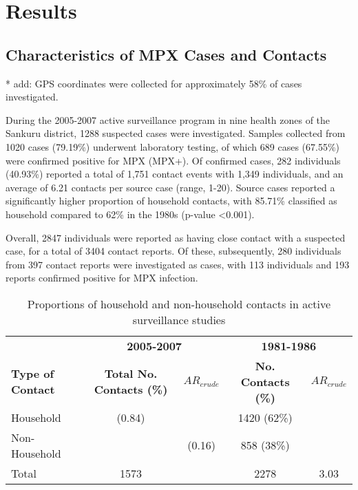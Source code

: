 \section{Results}

\subsection{Characteristics of MPX Cases and Contacts}

* add: GPS coordinates were collected for approximately 58\% of cases investigated. 

During the 2005-2007 active surveillance program in nine health zones of the Sankuru district, 1288 suspected cases were investigated. Samples collected from 1020 cases (79.19\%) underwent laboratory testing, of which 689 cases (67.55\%) were confirmed positive for MPX (MPX+). Of confirmed cases, 282 individuals (40.93\%) reported a total of 1,751 contact events with 1,349 individuals, and an average of 6.21 contacts per source case (range, 1-20). Source cases reported a significantly higher proportion of household contacts, with 85.71\% classified as household compared to 62\% in the 1980s (p-value \textless 0.001).

Overall, 2847 individuals were reported as having close contact with a suspected case, for a total of 3404 contact reports. Of these, subsequently, 280 individuals from 397 contact reports were investigated as cases, with 113 individuals and 193 reports confirmed positive for MPX infection. 

\begin{table}
\centering
\caption{Proportions of household and non-household contacts in active surveillance studies}
\begin{tabular}{lcccc} 
\toprule
& \multicolumn{2}{c}{\textbf{2005-2007}} & \multicolumn{2}{c}{\textbf{1981-1986}} \\
\cmidrule(l){2-3} \cmidrule(l){4-5} 
\textbf{Type of Contact}  &	\textbf{Total No. Contacts (\%)} &  $AR_{crude}$ &	\textbf{ No. Contacts (\%)} & $AR_{crude}$ \\
\midrule
Household  & (0.84) & ~ & 1420 (62\%) & ~\\
Non-Household  & ~ &	(0.16) & 858 (38\%) & ~ \\
\midrule
Total &	1573 & ~ & 2278 & 3.03 \\
\bottomrule
\end{tabular}
\end{table}



